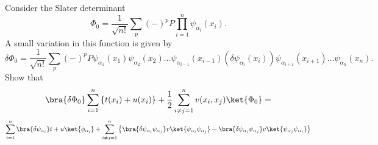 \begin{prob}
Consider the  Slater  determinant
\[
\Phi_{0}=\frac{1}{\sqrt{n!}}\sum_{p}(-)^{p}P
\prod_{i=1}^{n}\psi_{\alpha_{i}}(x_{i}).
\]
A small variation in this function is given by
\[
\delta\Phi_{0}=\frac{1}{\sqrt{n!}}\sum_{p}(-)^{p}P
\psi_{\alpha_{1}}(x_{1})\psi_{\alpha_{2}}(x_{2})\dots
\psi_{\alpha_{i-1}}(x_{i-1})(\delta\psi_{\alpha_{i}}(x_{i}))
\psi_{\alpha_{i+1}}(x_{i+1})\dots\psi_{\alpha_{n}}(x_{n}).
\]
Show that
\[
\bra{\delta\Phi_{0}}\sum_{i=1}^{n}\left\{t(x_{i})+u(x_{i})
\right\}+\frac{1}{2}
\sum_{i\neq j=1}^{n}v(x_{i},x_{j})\ket{\Phi_{0}}=
\]
\[
\sum_{i=1}^{n}\bra{\delta\psi_{\alpha_{i}}}t+u
\ket{\phi_{\alpha_{i}}}
+\sum_{i\neq j=1}^{n}\left\{\bra{\delta\psi_{\alpha_{i}}
\psi_{\alpha_{j}}}v\ket{\psi_{\alpha_{i}}\psi_{\alpha_{j}}}-
\bra{\delta\psi_{\alpha_{i}}\psi_{\alpha_{j}}}v
\ket{\psi_{\alpha_{j}}\psi_{\alpha_{i}}}\right\}
\]
\end{prob}

